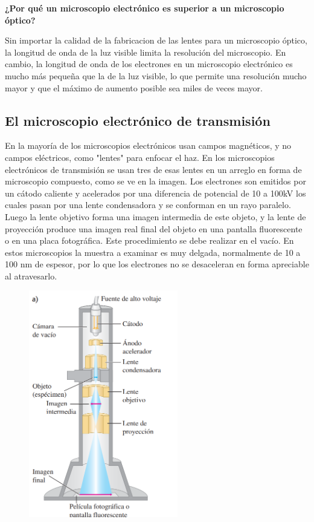 \documentclass[a4paper]{article}
\begin{document}
    \indent \textbf{¿Por qué un microscopio electrónico es superior a un microscopio óptico?}\\

    \newpage
    \noindent
    \thispagestyle{fancy}

    \indent Sin importar la calidad de la fabricacion de las lentes para un microscopio óptico, la longitud de onda de la luz visible limita la resolución del microscopio. En cambio, la longitud de onda de los electrones en un microscopio electrónico es mucho más pequeña que la de la luz visible, lo que permite una resolución mucho mayor y que el máximo de aumento posible sea miles de veces mayor.\\

    \subsection{El microscopio electrónico de transmisión}

    \indent En la mayoría de los microscopios electrónicos usan campos magnéticos, y no campos eléctricos, como "lentes" para enfocar el haz. En los microscopios electrónicos de transmisión se usan tres de esas lentes en un arreglo en forma de microscopio compuesto, como se ve en la imagen. Los electrones son emitidos por un cátodo caliente y acelerados por una diferencia de potencial de 10 a 100kV los cuales pasan por una lente condensadora y se conforman en un rayo paralelo. Luego la lente objetivo forma una imagen intermedia de este objeto, y la lente de proyección produce una imagen real final del objeto en una pantalla fluorescente o en una placa fotográfica. Este procedimiento se debe realizar en el vacío. En estos microscopios la muestra a examinar es muy delgada, normalmente de 10 a 100 nm de espesor, por lo que los electrones no se desaceleran en forma apreciable al atravesarlo.\\

    \begin{figure}[h!]
        \centering
        \includegraphics[width = 6.5cm]{../imagenes/microscopio.png}
    \end{figure}
\end{document}
